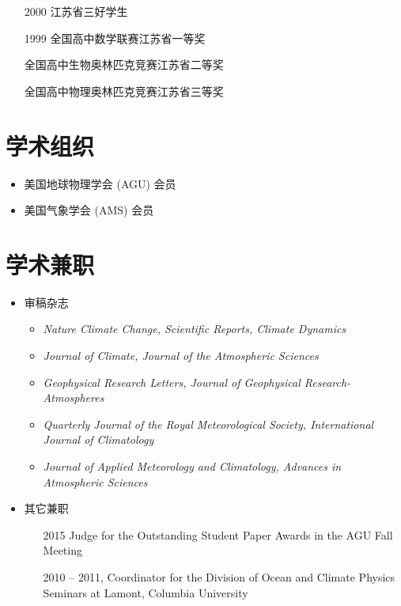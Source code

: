 \documentclass[11pt]{article}
\begin{document}
\begin{CJK*}{UTF8}{gkai}
\begin{itemize}[leftmargin=10ex,label={},noitemsep,nolistsep]
	\item[2000] 江苏省三好学生
	
	\item[1999] 全国高中数学联赛江苏省一等奖

	\item[\phantom{1999}] 全国高中生物奥林匹克竞赛江苏省二等奖

	\item[\phantom{1999}] 全国高中物理奥林匹克竞赛江苏省三等奖
\end{itemize}


\section{学术组织}
\begin{itemize}[leftmargin=4ex,label={},noitemsep,nolistsep]
	\item 美国地球物理学会 (AGU) 会员 
	\item 美国气象学会 (AMS) 会员
\end{itemize}


\section{学术兼职} 
\begin{itemize}[leftmargin=4ex,label={},noitemsep,nolistsep]
	\item 审稿杂志
    	\begin{itemize}[leftmargin=4ex,label={},noitemsep,nolistsep]
	\item \textit{Nature Climate Change, Scientific Reports, Climate Dynamics}
    	\item \textit{Journal of Climate, Journal of the Atmospheric Sciences}
	\item \textit{Geophysical Research Letters, Journal of Geophysical Research-Atmospheres}
	\item \textit{Quarterly Journal of the Royal Meteorological Society, International Journal of Climatology}
	\item \textit{Journal of Applied Meteorology and Climatology, Advances in Atmospheric Sciences}	
    	\end{itemize}
	
	\item 其它兼职
	\begin{itemize}[leftmargin=10ex,label={},noitemsep,nolistsep]
		\item[2015] Judge for the Outstanding Student Paper Awards in the AGU Fall Meeting
		\item[2010]-- 2011, Coordinator for the Division of Ocean and Climate Physics Seminars at Lamont, Columbia University
	\end{itemize}
\end{itemize}



\end{CJK*}
\end{document}
